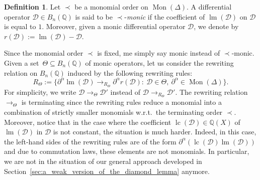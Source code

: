 \documentclass[11pt]{article}
\theoremstyle{definition}
\newtheorem{definition}[theorem]{Definition}
\newcommand\D{\mathcal{D}}
\DeclareMathOperator{\lm}{lm}
\DeclareMathOperator{\lc}{lc}
\newcommand\Q{\mathbb{Q}}
\newcommand\Weyl[1]{B_{#1}(\Q)}
\newcommand\monBasis{\Mon(\Delta)}
\DeclareMathOperator{\Mon}{Mon}
\newcommand\rewTheta{\to_\Theta}
\newcommand\RTheta{R_{\Theta}}
\begin{document}
\begin{definition}
  Let $\prec$ be a monomial order on $\monBasis$. A differential
  operator $\D\in\Weyl{n}$ is said to be $\prec$-{\em monic} if the
  coefficient of $\lm(\D)$ on $\D$ is equal to $1$. Moreover, given a
  monic differential operator $\D$, we denote by $r(\D):=\lm(\D)-\D$.
\end{definition}
\smallskip

Since the monomial order $\prec$ is fixed, me simply say monic instead of
$\prec$-monic. Given a set~$\Theta\subseteq\Weyl{n}$ of monic operators,
let us consider the rewriting relation on $\Weyl{n}$ induced by the
following rewriting rules: 
\begin{equation}\label{equ:rewTheta}
  \RTheta:=\Big\{\partial^\alpha\lm(\D)\to_{\RTheta}\partial^\alpha
  r(\D):\ \D\in\Theta,\ \partial^\alpha\in\Mon(\Delta)\Big\}.
\end{equation}
For simplicity, we write $\D\rewTheta\D'$ instead of
$\D\to_{R_\Theta}\D'$. The rewriting relation $\rewTheta$ is terminating
since the rewriting rules reduce a monomial into a combination of
strictly smaller monomials w.r.t.\ the terminating order $\prec$.
Moreover, notice that in the case where the coefficient $\lc(\D)\in\Q(X)$
of $\lm(\D)$ in $\D$ is not constant, the situation is much harder.
Indeed, in this case, the left-hand sides of the rewriting rules are of
the form $\partial^\alpha(\lc(\D)\lm(\D))$ and due to commutation laws,
these elements are not monomials. In particular, we are not in the
situation of our general approach developed in  
Section~\ref{sec:a_weak_version_of_the_diamond_lemma} anymore.
\medskip
\end{document}
